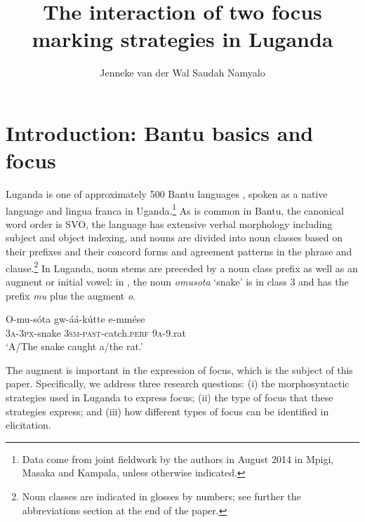 \documentclass[output=paper]{langsci/langscibook}
\title{The interaction of two focus marking strategies in Luganda}
\author{%
Jenneke van der Wal \affiliation{University of Cambridge}\lastand 
 Saudah Namyalo \affiliation{Makerere University}
}
\begin{document}
 
 
%



\section{Introduction: Bantu basics and focus} 

Luganda is one of approximately 500 Bantu languages \citep[4]{NursePhilippson2003}, spoken as a native language and lingua franca in Uganda.\footnote{Data come from joint fieldwork by the authors in August 2014 in Mpigi, Masaka and Kampala, unless otherwise indicated.}{} As is common in Bantu, the canonical word order is SVO, the language has extensive verbal morphology including subject and object indexing, and nouns are divided into noun classes based on their prefixes and their concord forms and agreement patterns in the phrase and clause.\footnote{Noun classes are indicated in glosses by numbers; see further the abbreviations section at the end of the paper.}{} In Luganda, noun stems are preceded by a noun class prefix as well as an augment or initial vowel: in , the noun \textit{omusota} ‘snake’ is in class 3 and has the prefix \textit{mu} plus the augment \textit{o}. 

\ea
\gll O-mu-sóta  gw-áá-kútte      e-mmése\\
     \textsc{3a}-\textsc{3px}-snake  \textsc{3sm}-\textsc{past}-catch.\textsc{perf}  \textsc{9a}-9.rat\\
\glt ‘A/The snake caught a/the rat.’
\z

The augment is important in the expression of focus, which is the subject of this paper. Specifically, we address three research questions: 
(i) the morphosyntactic strategies used in Luganda to express focus; 
(ii) the type of focus that these strategies express; 
and (iii) how different types of focus can be identified in elicitation.
\end{document}
